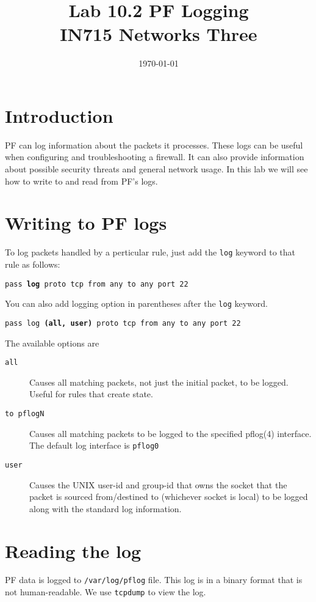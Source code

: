 \documentclass{article}
\begin{document}
\title{ Lab 10.2 PF Logging\\ IN715 Networks Three}
\date{\today}
\maketitle

\section*{Introduction}
PF can log information about the packets it processes.  These logs can be useful when configuring and troubleshooting 
a firewall.  It can also provide information about possible security threats and general network usage.  In this lab
we will see how to write to and read from PF's logs.

\section{Writing to PF logs}
To log packets handled by a perticular rule, just add the \texttt{log} keyword to that rule as follows:

\texttt{pass \textbf{log} proto tcp from any to any port 22}

You can also add logging option in parentheses after the \texttt{log} keyword.

\texttt{pass log \textbf{(all, user)} proto tcp from any to any port 22}

The available options are

\begin{description}
	\item[\texttt{all}] Causes all matching packets, not just the initial packet, to be logged. Useful for rules that create state.
	\item[\texttt{to pflogN}] Causes all matching packets to be logged to the specified pflog(4) interface. The default log interface is \texttt{pflog0}
	\item[\texttt{user}] Causes the UNIX user-id and group-id that owns the socket that the packet is sourced from/destined to (whichever socket is local) to be logged along with the standard log information.
\end{description}

\section{Reading the log}
PF data is logged to \texttt{/var/log/pflog} file.  This log is in a binary format that is not human-readable.  We use \texttt{tcpdump} to view the log.
\end{document}
